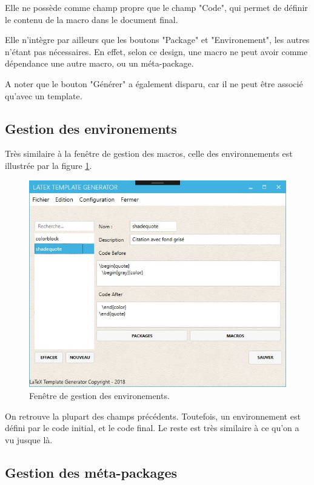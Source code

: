 \documentclass[a4paper, oneside]{article}
\begin{document}
Elle ne possède comme champ propre que le champ "Code", qui permet de définir le
contenu de la macro dans le document final.

Elle n'intègre par ailleurs que les boutons "Package" et "Environement", les
autres n'étant pas nécessaires. En effet, selon ce design, une macro ne peut
avoir comme dépendance une autre macro, ou un méta-package.

A noter que le bouton "Générer" a également disparu, car il ne peut être associé
qu'avec un template.

\subsection{Gestion des environements}
\label{sec:org52b7968}

Très similaire à la fenêtre de gestion des macros, celle des environnements est
illustrée par la figure \ref{fig:org113a461}.

\begin{figure}[htbp]
\centering
\includegraphics[width=.9\linewidth]{../Images/environment.jpg}
\caption{\label{fig:org113a461}
Fenêtre de gestion des environements.}
\end{figure}

On retrouve la plupart des champs précédents. Toutefois, un environnement est
défini par le code initial, et le code final. Le reste est très similaire à ce
qu'on a vu jusque là.

\subsection{Gestion des méta-packages}
\label{sec:orgfe6e7b7}
\end{document}
